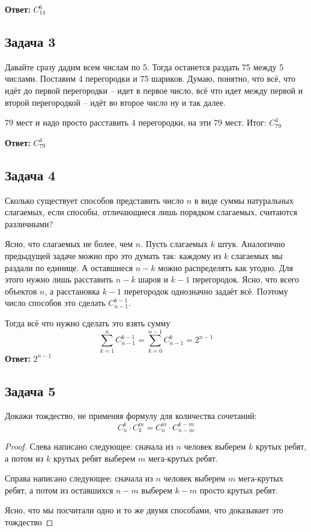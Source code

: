 \textbf{Ответ:} $C^6_{14}$

\subsection{Задача 3}

Давайте сразу дадим всем числам по 5. Тогда останется раздать 75 между 5 числами. Поставим 4 перегородки и 75 шариков. Думаю, понятно, что всё, что идёт до первой перегородки -- идет в первое число, всё что идет между первой и второй перегородкой -- идёт во второе число ну и так далее.

79 мест и надо просто расставить 4 перегородки, на эти 79 мест. Итог: $C^4_{79}$

\textbf{Ответ:} $C^4_{79}$

\subsection{Задача 4}

Сколько существует способов представить число $n$ в виде суммы натуральных слагаемых, если способы, отличающиеся лишь порядком слагаемых, считаются различными?

Ясно, что слагаемых не более, чем $n$. Пусть слагаемых $k$ штук. Аналогично предыдущей задаче можно про это думать так: каждому из $k$ слагаемых мы раздали по единице. А оставшиеся $n - k$ можно распределять как угодно. Для этого нужно лишь расставить $n - k$ шаров и $k - 1$ перегородок. Ясно, что всего объектов $n$, а расстановка $k - 1$ перегородок однозначно задаёт всё. Поэтому число способов это сделать $C^{k-1}_{n-1}$.

Тогда всё что нужно сделать это взять сумму
\[
\sum_{k=1}^{n} C^{k-1}_{n-1} = \sum_{k=0}^{n-1} C^{k}_{n-1} = 2^{n-1}
\]
\textbf{Ответ:} $2^{n-1}$

\subsection{Задача 5}

Докажи тождество, не применяя формулу для количества сочетаний:
\[
C^k_n\cdot C^m_k = C^m_n \cdot C^{k-m}_{n-m}
\]

\begin{proof}
Слева написано следующее: сначала из $n$ человек выберем $k$ крутых ребят, а потом из $k$ крутых ребят выберем $m$ мега-крутых ребят.

Справа написано следующее: сначала из $n$ человек выберем $m$ мега-крутых ребят, а потом из оставшихся $n - m$ выберем $k- m$ просто крутых ребят. 

Ясно, что мы посчитали одно и то же двумя способами, что доказывает это тождество
\end{proof}

